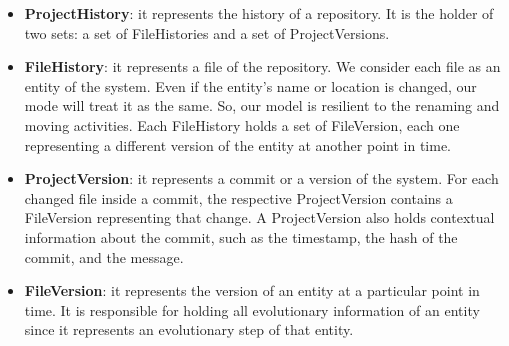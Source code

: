 \begin{itemize}
    \item \textbf{ProjectHistory}: it represents the history of a repository. It is the holder of two sets: a set of FileHistories and a set of ProjectVersions. 
    \item \textbf{FileHistory}: it represents a file of the repository. We consider each file as an entity of the system. Even if the entity's name or location is changed, our mode will treat it as the same. So, our model is resilient to the renaming and moving activities. Each FileHistory holds a set of FileVersion, each one representing a different version of the entity at another point in time.  
    \item \textbf{ProjectVersion}: it represents a commit or a version of the system. 
    For each changed file inside a commit, the respective ProjectVersion contains a FileVersion representing that change.
    A ProjectVersion also holds contextual information about the commit, such as the timestamp, the hash of the commit, and the message.
    \item \textbf{FileVersion}: it represents the version of an entity at a particular point in time.
    It is responsible for holding all evolutionary information of an entity since it represents an evolutionary step of that entity. 
\end{itemize}
\bigbreak

